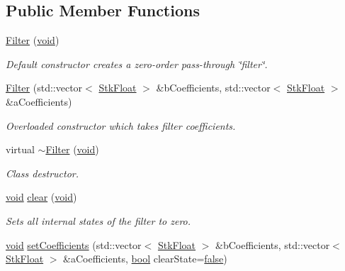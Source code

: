 \subsection*{Public Member Functions}
\begin{DoxyCompactItemize}
\item 
\hyperlink{class_nyq_1_1_filter_ab86c90163e27f662edd126f5ae0d0334}{Filter} (\hyperlink{sound_8c_ae35f5844602719cf66324f4de2a658b3}{void})
\begin{DoxyCompactList}\small\item\em Default constructor creates a zero-\/order pass-\/through \char`\"{}filter\char`\"{}. \end{DoxyCompactList}\item 
\hyperlink{class_nyq_1_1_filter_a0851424ed1d45701b45a75b8bde04190}{Filter} (std\+::vector$<$ \hyperlink{namespace_nyq_a044fa20a706520a617bbbf458a7db7e4}{Stk\+Float} $>$ \&b\+Coefficients, std\+::vector$<$ \hyperlink{namespace_nyq_a044fa20a706520a617bbbf458a7db7e4}{Stk\+Float} $>$ \&a\+Coefficients)
\begin{DoxyCompactList}\small\item\em Overloaded constructor which takes filter coefficients. \end{DoxyCompactList}\item 
virtual \hyperlink{class_nyq_1_1_filter_a5d7ba6a80d45796887ac4032b6dbb29a}{$\sim$\+Filter} (\hyperlink{sound_8c_ae35f5844602719cf66324f4de2a658b3}{void})
\begin{DoxyCompactList}\small\item\em Class destructor. \end{DoxyCompactList}\item 
\hyperlink{sound_8c_ae35f5844602719cf66324f4de2a658b3}{void} \hyperlink{class_nyq_1_1_filter_a0025ddcb760ab59042a1b7f1454d7f86}{clear} (\hyperlink{sound_8c_ae35f5844602719cf66324f4de2a658b3}{void})
\begin{DoxyCompactList}\small\item\em Sets all internal states of the filter to zero. \end{DoxyCompactList}\item 
\hyperlink{sound_8c_ae35f5844602719cf66324f4de2a658b3}{void} \hyperlink{class_nyq_1_1_filter_a8ce7b879f1902dbb72a5abba3e54d6a7}{set\+Coefficients} (std\+::vector$<$ \hyperlink{namespace_nyq_a044fa20a706520a617bbbf458a7db7e4}{Stk\+Float} $>$ \&b\+Coefficients, std\+::vector$<$ \hyperlink{namespace_nyq_a044fa20a706520a617bbbf458a7db7e4}{Stk\+Float} $>$ \&a\+Coefficients, \hyperlink{mac_2config_2i386_2lib-src_2libsoxr_2soxr-config_8h_abb452686968e48b67397da5f97445f5b}{bool} clear\+State=\hyperlink{mac_2config_2i386_2lib-src_2libsoxr_2soxr-config_8h_a65e9886d74aaee76545e83dd09011727}{false})

\end{DoxyCompactItemize}
